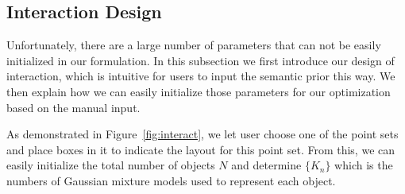 \subsection{Interaction Design}
\label{sec:imp:interact}
Unfortunately, there are a large number of parameters that can not be easily initialized in our formulation. 
%
In this subsection we first introduce our design of interaction, which is intuitive for users to input the semantic prior this way. We then explain how we can easily initialize those parameters for our optimization based on the manual input.


As demonstrated in Figure~\ref{fig:interact}, we let user choose one of the point sets and place boxes in it to indicate the layout for this point set. From this, we can easily initialize the total number of objects $N$ and determine $\{K_n\}$ which is the numbers of Gaussian mixture models used to represent each object.
